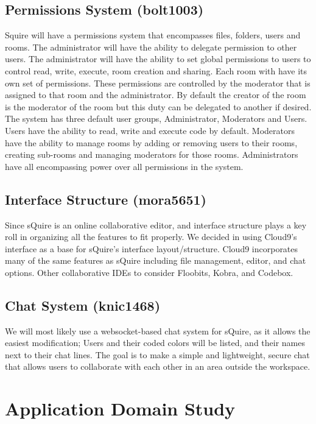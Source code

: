 \documentclass[11pt]{report}
\begin{document}
\subsection{Permissions System (bolt1003)}
Squire will have a permissions system that encompasses files, folders, users and rooms. The administrator will have the ability to delegate permission to other users.  The administrator will have the ability to set global permissions to users to control read, write, execute, room creation and sharing.  Each room with have its own set of permissions. These permissions are controlled by the moderator that is assigned to that room and the administrator. By default the creator of the room is the moderator of the room but this duty can be delegated to another if desired. The system has three default user groups, Administrator, Moderators and Users. Users have the ability to read, write and execute code by default. Moderators have the ability to manage rooms by adding or removing users to their rooms, creating sub-rooms and managing moderators for those rooms. Administrators have all encompassing power over all permissions in the system.

\subsection{Interface Structure (mora5651)}
Since sQuire is an online collaborative editor, and interface structure plays a key roll in organizing all the features to fit properly. We decided in using Cloud9's interface as a base for sQuire's interface layout/structure. Cloud9 incorporates many of the same features as sQuire including file management, editor, and chat options. Other collaborative IDEs to consider Floobits, Kobra, and Codebox. 

\subsection{Chat System (knic1468)}
We will most likely use a websocket-based chat system for sQuire, as it allows the easiest modification; Users and their coded colors will be listed, and their names next to their chat lines. The goal is to make a simple and lightweight, secure chat that allows users to collaborate with each other in an area outside the workspace.




\section{Application Domain Study}
\end{document}
